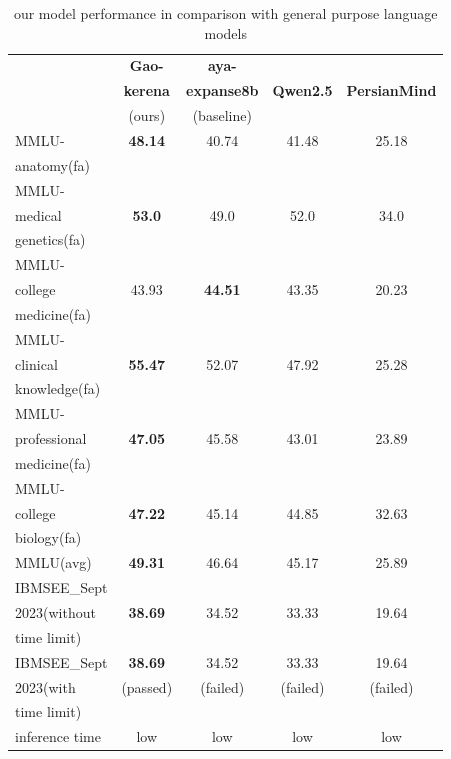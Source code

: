 \documentclass[conference]{IEEEtran}
\begin{document}
\begin{table}[ht]
	\centering
	\caption{
		our model performance 
		in comparison with general purpose language models
		}
	\begin{tabular}{|l|c|c|c|c|}  %
		\hline
		\textbf{} & \textbf{Gao-} & \textbf{aya-} &  &  \\ 
		 & \textbf{kerena} & \textbf{expanse8b} & \textbf{Qwen2.5} & \textbf{PersianMind} \\
		 & (ours) & (baseline) &  &  \\ \hline
		MMLU- & \textbf{48.14} & 40.74 & 41.48 & 25.18 \\ 
		anatomy(fa) &  &  &  &  \\ \hline
		MMLU- &  &  &  &  \\
		medical & \textbf{53.0} & 49.0 & 52.0 & 34.0 \\ 
		genetics(fa) &  &  &  &  \\ \hline
		MMLU- &  &  &  &  \\
		college & 43.93 & \textbf{44.51} & 43.35 & 20.23 \\
		medicine(fa) &  &  &  &  \\ \hline
		MMLU- &  &  &  &  \\
		clinical& \textbf{55.47} & 52.07 & 47.92 & 25.28 \\
		knowledge(fa)&  &  &  &  \\ \hline
		MMLU- &  &  &  &  \\
        professional& \textbf{47.05} & 45.58 & 43.01 & 23.89 \\ 
        medicine(fa)&  &  &  &  \\ \hline
        MMLU- &  &  &  &  \\
        college& \textbf{47.22} & 45.14 & 44.85 & 32.63 \\
        biology(fa)&  &  &  &  \\ \hline
        MMLU(avg) & \textbf{49.31} & 46.64 & 45.17 & 25.89 \\ \hline
		IBMSEE\_Sept &  &  &  &  \\ 
        2023(without & \textbf{38.69} & 34.52 & 33.33 & 19.64 \\  
         time limit) &  &  &  &  \\  \hline
        IBMSEE\_Sept & \textbf{38.69} & 34.52 & 33.33 & 19.64 \\ 
        2023(with & (passed) & (failed) & (failed) & (failed) \\  
        time limit) &  &  &  &  \\  \hline
        inference time & low & low & low & low \\  \hline
	\end{tabular}
	\label{tab:model_results_on_mcqa_vs_general_purpose_languages}
\end{table}
\end{document}
